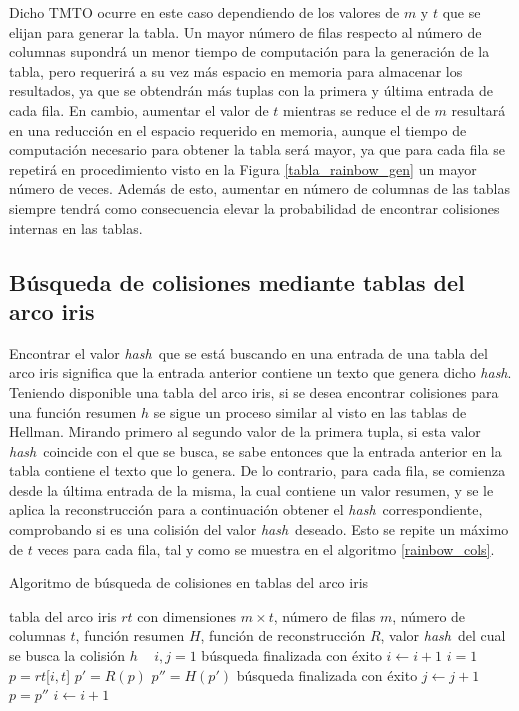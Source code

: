 \documentclass[12pt,spanish,listoffigures,listoftables,listofalgorithms]{tfgetsinf}
\newcommand{\hash}{\textit{hash}}
\begin{document}
Dicho TMTO ocurre en este caso dependiendo de los valores de $m$ y $t$ que se elijan para generar la tabla. Un mayor número de filas respecto al número de columnas supondrá un menor tiempo de computación para la generación de la tabla, pero requerirá a su vez más espacio en memoria para almacenar los resultados, ya que se obtendrán más tuplas con la primera y última entrada de cada fila. En cambio, aumentar el valor de $t$ mientras se reduce el de $m$ resultará en una reducción en el espacio requerido en memoria, aunque el tiempo de computación necesario para obtener la tabla será mayor, ya que para cada fila se repetirá en procedimiento visto en la Figura \ref{tabla_rainbow_gen} un mayor número de veces. Además de esto, aumentar en número de columnas de las tablas siempre tendrá como consecuencia elevar la probabilidad de encontrar colisiones internas en las tablas.

\subsection{Búsqueda de colisiones mediante tablas del arco iris}

Encontrar el valor \hash~que se está buscando en una entrada de una tabla del arco iris significa que la entrada anterior contiene un texto que genera dicho \hash. Teniendo disponible una tabla del arco iris, si se desea encontrar colisiones para una función resumen $h$ se sigue un proceso similar al visto en las tablas de Hellman. Mirando primero al segundo valor de la primera tupla, si esta valor \hash~coincide con el que se busca, se sabe entonces que la entrada anterior en la tabla contiene el texto que lo genera. De lo contrario, para cada fila, se comienza desde la última entrada de la misma, la cual contiene un valor resumen, y se le aplica la reconstrucción para a continuación obtener el \hash~correspondiente, comprobando si es una colisión del valor \hash~deseado. Esto se repite un máximo de $t$ veces para cada fila, tal y como se muestra en el algoritmo \ref{rainbow_cols}.

\begin{algorithm}
	\caption{Algoritmo de búsqueda de colisiones en tablas del arco iris}
	\label{rainbow_cols}
	\begin{algorithmic}
		\REQUIRE tabla del arco iris $rt$ con dimensiones $m \times t$, número de filas $m$, número de columnas $t$, función resumen $H$, función de reconstrucción $R$, valor \hash~del cual se busca la colisión $h$
		\STATE ~
		\STATE $i, j = 1$
				\STATE búsqueda finalizada con éxito
			\ELSE
				\STATE $i \leftarrow i + 1$
			\ENDIF
		\ENDWHILE
		\STATE $i = 1$
			\STATE $p = rt$[$i, t$]
				\STATE $p' = R(p)$
				\STATE $p'' = H(p')$
					\STATE búsqueda finalizada con éxito
				\ELSE 
					\STATE $j \leftarrow j + 1$
					\STATE $p = p''$
				\ENDIF
			\ENDWHILE
			\STATE $i \leftarrow i + 1$
		\ENDWHILE
	\end{algorithmic}
\end{algorithm}
\end{document}
